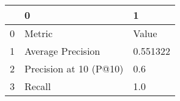 \begin{tabular}{lll}
\toprule
{} &                       0 &         1 \\
\midrule
0 &                  Metric &     Value \\
1 &       Average Precision &  0.551322 \\
2 &  Precision at 10 (P@10) &       0.6 \\
3 &                  Recall &       1.0 \\
\bottomrule
\end{tabular}
